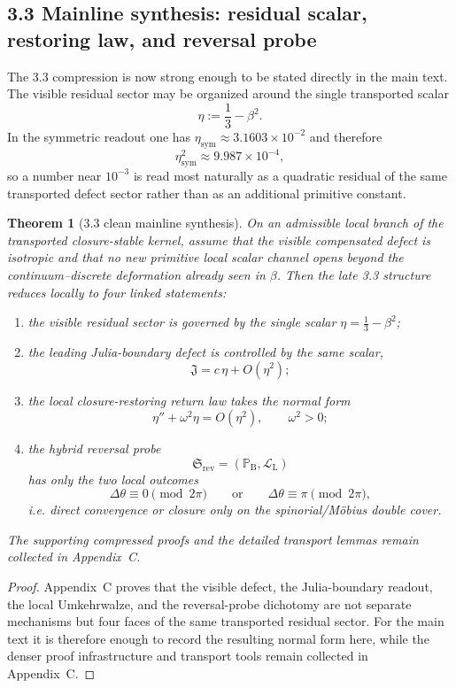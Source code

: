 \documentclass[12pt,a4paper]{article}
\newtheorem{theorem}{Theorem}[section]
\begin{document}
\subsection*{3.3 Mainline synthesis: residual scalar, restoring law, and reversal probe}
The 3.3 compression is now strong enough to be stated directly in the main text. The visible residual sector may be organized around the single transported scalar
\[
 \eta:=\frac13-\beta^2.
\]
In the symmetric readout one has $\eta_{\mathrm{sym}}\approx 3.1603\times10^{-2}$ and therefore
\[
 \eta_{\mathrm{sym}}^2\approx 9.987\times10^{-4},
\]
so a number near $10^{-3}$ is read most naturally as a quadratic residual of the same transported defect sector rather than as an additional primitive constant.

\begin{theorem}[3.3 clean mainline synthesis]
\label{thm:mainline-332}
On an admissible local branch of the transported closure-stable kernel, assume that the visible compensated defect is isotropic and that no new primitive local scalar channel opens beyond the continuum--discrete deformation already seen in $\beta$. Then the late 3.3 structure reduces locally to four linked statements:
\begin{enumerate}[label=(\roman*)]
 \item the visible residual sector is governed by the single scalar $\eta=\frac13-\beta^2$;
 \item the leading Julia-boundary defect is controlled by the same scalar,
 \[
 \mathfrak J = c\,\eta + O(\eta^2);
 \]
 \item the local closure-restoring return law takes the normal form
 \[
 \eta''+\omega^2\eta = O(\eta^2), \qquad \omega^2>0;
 \]
 \item the hybrid reversal probe
 \[
 \mathfrak S_{\mathrm{rev}}=(\mathbb P_{\mathrm B},\mathcal L_{\mathrm L})
 \]
 has only the two local outcomes
 \[
 \Delta\theta\equiv 0 \pmod{2\pi}
 \qquad\text{or}\qquad
 \Delta\theta\equiv \pi \pmod{2\pi},
 \]
 i.e. direct convergence or closure only on the spinorial/M\"obius double cover.
\end{enumerate}
The supporting compressed proofs and the detailed transport lemmas remain collected in Appendix~C.
\end{theorem}

\begin{proof}
Appendix~C proves that the visible defect, the Julia-boundary readout, the local Umkehrwalze, and the reversal-probe dichotomy are not separate mechanisms but four faces of the same transported residual sector. For the main text it is therefore enough to record the resulting normal form here, while the denser proof infrastructure and transport tools remain collected in Appendix~C.
\end{proof}
\end{document}
